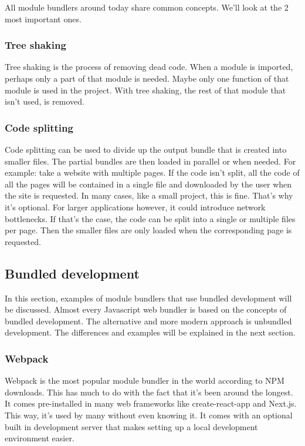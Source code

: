 All module bundlers around today share common concepts. We’ll look at the 2 most important ones. 

\subsubsection{Tree shaking}
Tree shaking is the process of removing dead code. When a module is imported, perhaps only a part of that module is needed. Maybe only one function of that module is used in the project. With tree shaking, the rest of that module that isn’t used, is removed. 

\subsubsection{Code splitting}
Code splitting can be used to divide up the output bundle that is created into smaller files. The partial bundles are then loaded in parallel or when needed. For example: take a website with multiple pages. If the code isn’t split, all the code of all the pages will be contained in a single file and downloaded by the user when the site is requested. In many cases, like a small project, this is fine. That’s why it’s optional. For larger applications however, it could introduce network bottlenecks. If that’s the case, the code can be split into a single or multiple files per page. Then the smaller files are only loaded when the corresponding page is requested. 

\subsection{Bundled development}

In this section, examples of module bundlers that use bundled development will be discussed. Almost every Javascript web bundler is based on the concepts of bundled development. The alternative and more modern approach is unbundled development. The differences and examples will be explained in the next section. 

\subsubsection{Webpack}

Webpack is the most popular module bundler in the world according to NPM downloads. This has much to do with the fact that it's been around the longest. It comes pre-installed in many web frameworks like create-react-app and Next.js. This way, it’s used by many without even knowing it. It comes with an optional built in development server that makes setting up a local development environment easier.

